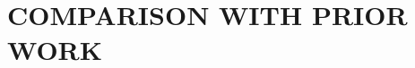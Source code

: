 \renewcommand{\thechapter}{\Roman{chapter}}
\chapter{COMPARISON WITH PRIOR WORK}
\renewcommand{\thechapter}{\arabic{chapter}}
